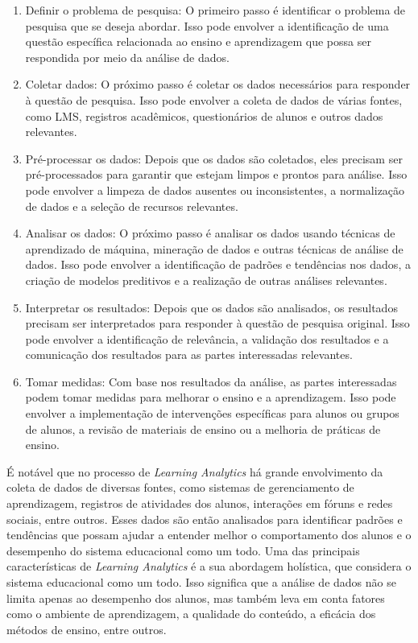 \begin{enumerate}
    \item {Definir o problema de pesquisa: O primeiro passo é identificar o problema de pesquisa que se deseja abordar. Isso pode envolver a identificação de uma questão específica relacionada ao ensino e aprendizagem que possa ser respondida por meio da análise de dados.}
    \item {Coletar dados: O próximo passo é coletar os dados necessários para responder à questão de pesquisa. Isso pode envolver a coleta de dados de várias fontes, como LMS, registros acadêmicos, questionários de alunos e outros dados relevantes.}
    \item {Pré-processar os dados: Depois que os dados são coletados, eles precisam ser pré-processados para garantir que estejam limpos e prontos para análise. Isso pode envolver a limpeza de dados ausentes ou inconsistentes, a normalização de dados e a seleção de recursos relevantes.}
    \item {Analisar os dados: O próximo passo é analisar os dados usando técnicas de aprendizado de máquina, mineração de dados e outras técnicas de análise de dados. Isso pode envolver a identificação de padrões e tendências nos dados, a criação de modelos preditivos e a realização de outras análises relevantes.}
    \item {Interpretar os resultados: Depois que os dados são analisados, os resultados precisam ser interpretados para responder à questão de pesquisa original. Isso pode envolver a identificação de relevância, a validação dos resultados e a comunicação dos resultados para as partes interessadas relevantes.}
    \item {Tomar medidas: Com base nos resultados da análise, as partes interessadas podem tomar medidas para melhorar o ensino e a aprendizagem. Isso pode envolver a implementação de intervenções específicas para alunos ou grupos de alunos, a revisão de materiais de ensino ou a melhoria de práticas de ensino.}
    
\end{enumerate}

{É notável que no processo de \textit{Learning Analytics} há grande envolvimento da coleta de dados de diversas fontes, como sistemas de gerenciamento de aprendizagem, registros de atividades dos alunos, interações em fóruns e redes sociais, entre outros. Esses dados são então analisados para identificar padrões e tendências que possam ajudar a entender melhor o comportamento dos alunos e o desempenho do sistema educacional como um todo. Uma das principais características de \textit{Learning Analytics} é a sua abordagem holística, que considera o sistema educacional como um todo. Isso significa que a análise de dados não se limita apenas ao desempenho dos alunos, mas também leva em conta fatores como o ambiente de aprendizagem, a qualidade do conteúdo, a eficácia dos métodos de ensino, entre outros.}


